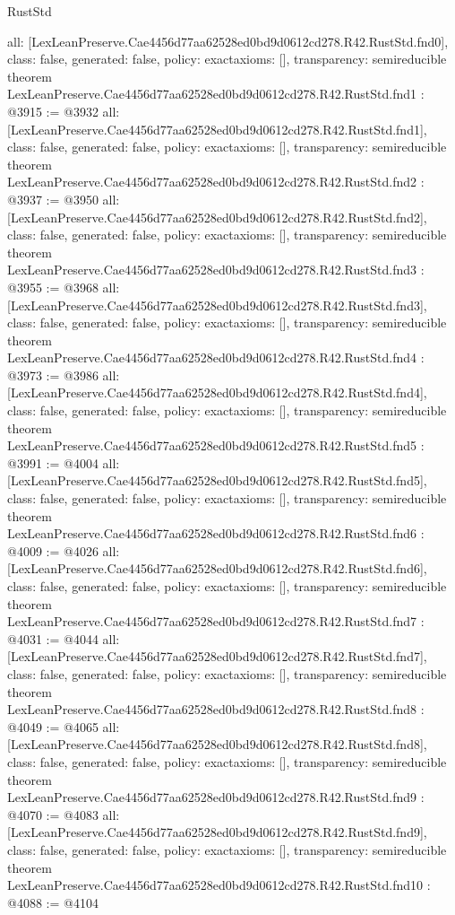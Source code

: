 \begin{lexlean}{RustStd}
\begin{coremodule}
{  all: [LexLeanPreserve.Cae4456d77aa62528ed0bd9d0612cd278.R42.RustStd.fnd0],
  class: false,
  generated: false,
  policy: exact{axioms: []},
  transparency: semireducible
}
theorem LexLeanPreserve.Cae4456d77aa62528ed0bd9d0612cd278.R42.RustStd.fnd1 : @3915 := @3932 {
  all: [LexLeanPreserve.Cae4456d77aa62528ed0bd9d0612cd278.R42.RustStd.fnd1],
  class: false,
  generated: false,
  policy: exact{axioms: []},
  transparency: semireducible
}
theorem LexLeanPreserve.Cae4456d77aa62528ed0bd9d0612cd278.R42.RustStd.fnd2 : @3937 := @3950 {
  all: [LexLeanPreserve.Cae4456d77aa62528ed0bd9d0612cd278.R42.RustStd.fnd2],
  class: false,
  generated: false,
  policy: exact{axioms: []},
  transparency: semireducible
}
theorem LexLeanPreserve.Cae4456d77aa62528ed0bd9d0612cd278.R42.RustStd.fnd3 : @3955 := @3968 {
  all: [LexLeanPreserve.Cae4456d77aa62528ed0bd9d0612cd278.R42.RustStd.fnd3],
  class: false,
  generated: false,
  policy: exact{axioms: []},
  transparency: semireducible
}
theorem LexLeanPreserve.Cae4456d77aa62528ed0bd9d0612cd278.R42.RustStd.fnd4 : @3973 := @3986 {
  all: [LexLeanPreserve.Cae4456d77aa62528ed0bd9d0612cd278.R42.RustStd.fnd4],
  class: false,
  generated: false,
  policy: exact{axioms: []},
  transparency: semireducible
}
theorem LexLeanPreserve.Cae4456d77aa62528ed0bd9d0612cd278.R42.RustStd.fnd5 : @3991 := @4004 {
  all: [LexLeanPreserve.Cae4456d77aa62528ed0bd9d0612cd278.R42.RustStd.fnd5],
  class: false,
  generated: false,
  policy: exact{axioms: []},
  transparency: semireducible
}
theorem LexLeanPreserve.Cae4456d77aa62528ed0bd9d0612cd278.R42.RustStd.fnd6 : @4009 := @4026 {
  all: [LexLeanPreserve.Cae4456d77aa62528ed0bd9d0612cd278.R42.RustStd.fnd6],
  class: false,
  generated: false,
  policy: exact{axioms: []},
  transparency: semireducible
}
theorem LexLeanPreserve.Cae4456d77aa62528ed0bd9d0612cd278.R42.RustStd.fnd7 : @4031 := @4044 {
  all: [LexLeanPreserve.Cae4456d77aa62528ed0bd9d0612cd278.R42.RustStd.fnd7],
  class: false,
  generated: false,
  policy: exact{axioms: []},
  transparency: semireducible
}
theorem LexLeanPreserve.Cae4456d77aa62528ed0bd9d0612cd278.R42.RustStd.fnd8 : @4049 := @4065 {
  all: [LexLeanPreserve.Cae4456d77aa62528ed0bd9d0612cd278.R42.RustStd.fnd8],
  class: false,
  generated: false,
  policy: exact{axioms: []},
  transparency: semireducible
}
theorem LexLeanPreserve.Cae4456d77aa62528ed0bd9d0612cd278.R42.RustStd.fnd9 : @4070 := @4083 {
  all: [LexLeanPreserve.Cae4456d77aa62528ed0bd9d0612cd278.R42.RustStd.fnd9],
  class: false,
  generated: false,
  policy: exact{axioms: []},
  transparency: semireducible
}
theorem LexLeanPreserve.Cae4456d77aa62528ed0bd9d0612cd278.R42.RustStd.fnd10 : @4088 := @4104 {
}
\end{coremodule}
\end{lexlean}
